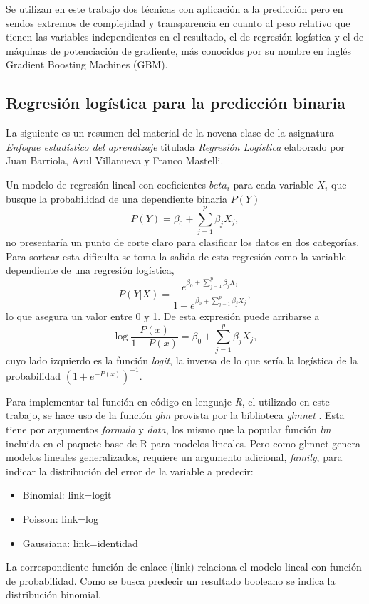 \documentclass[a4paper]{report}
\begin{document}
Se utilizan en este trabajo dos técnicas con aplicación a la predicción pero en sendos extremos de complejidad y transparencia en cuanto al peso relativo que tienen las variables independientes en el resultado, el de regresión logística y el de máquinas de potenciación de gradiente, más conocidos por su nombre en inglés Gradient Boosting Machines (GBM).


\subsection{Regresión logística para la predicción binaria}

La siguiente es un resumen del material de la novena clase de la asignatura \emph{Enfoque estadístico del aprendizaje} titulada \emph{Regresión Logística} elaborado por Juan Barriola, Azul Villanueva y Franco Mastelli. 

Un modelo de regresión lineal con coeficientes \(beta_i\) para cada variable \(X_i\) que busque la probabilidad de una dependiente binaria \(P(Y)\)  
\[
P(Y) = \beta_0 + \sum\limits_{j=1}^p \beta_j X_j,	
\]
no presentaría un punto de corte claro para clasificar los datos en dos categorías.
Para sortear esta dificulta se toma la salida de esta regresión como la variable dependiente de una regresión logística,
\[
P(Y|X)= \frac{e^{\beta_0 + \sum\limits_{j=1}^p \beta_j X_j}}{1+e^{\beta_0 + \sum\limits_{j=1}^p \beta_j X_j}},
\]
lo que asegura un valor entre 0 y 1.
De esta expresión puede arribarse a 
\[
	\log {\frac{P(x)}{1-P(x)}}= \beta_0 + \sum\limits_{j=1}^p \beta_j X_j,
\]
cuyo lado izquierdo es la función \emph{logit}, la inversa de lo que sería la logística de la probabilidad \(\left(1 + e^{-{P(x)}}\right)^{-1}\).

Para implementar tal función en código en lenguaje \emph{R}, el utilizado en este trabajo, se hace uso de la función \emph{glm} provista por la biblioteca \emph{glmnet} \cite{friedman_glmnet_2023}. 
Esta tiene por argumentos \emph{formula} y \emph{data}, los mismo que la popular función \emph{lm} incluida en el paquete base de R para modelos lineales.
Pero como glmnet genera modelos lineales generalizados, requiere un argumento adicional, \emph{family}, para indicar la distribución del error de la variable a predecir:
\begin{itemize}
	\item Binomial: link=logit
	\item Poisson: link=log
	\item Gaussiana: link=identidad
\end{itemize}
La correspondiente función de enlace (link) relaciona el modelo lineal con función de probabilidad.
Como se busca predecir un resultado booleano se indica la distribución binomial.
\end{document}
